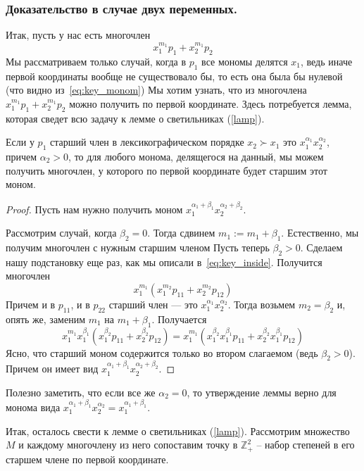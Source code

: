 \subsubsection{Доказательство в случае двух переменных.}
Итак, пусть у нас есть многочлен \[x_1^{m_1}p_1+x_2^{m_1}p_2\]
Мы рассматриваем только случай, когда в $p_1$ все мономы делятся $x_1$, ведь иначе первой координаты вообще не существовало бы, то есть она была бы нулевой (что видно из~\eqref{eq:key_monom})
Мы хотим узнать, что из многочлена $x_1^{m_1}p_1+x_2^{m_1}p_2$ можно получить по первой координате.
Здесь потребуется лемма, которая сведет всю задачу к лемме о светильниках (\ref{lamp}).\vskip 0.1in\noindent
\begin{lemma}
    Если у $p_1$ старший член в лексикографическом порядке $x_2\succ x_1$ это $x_1^{\alpha_1}x_2^{\alpha_2}$, причем $\alpha_2>0$, то для любого монома, делящегося на данный, мы можем получить многочлен, у которого по первой координате будет старшим этот моном.
\end{lemma}
\begin{proof}
    Пусть нам нужно получить моном $x_1^{\alpha_1+\beta_1}x_2^{\alpha_2+\beta_2}$.

    Рассмотрим случай, когда $\beta_2=0$.
    Тогда сдвинем %
    $m_1 := m_1+\beta_1$.
    Естественно, мы получим многочлен с нужным старшим членом
    Пусть теперь $\beta_2>0$.
    Сделаем нашу подстановку еще раз, как мы описали в~\eqref{eq:key_inside}.
    Получится многочлен
    \[x_1^{m_1}(x_1^{m_2} p_{11}+x_2^{m_2} p_{12})\]Причем и в $p_{11}$, и в $p_{22}$ старший член --- это $x_1^{\alpha_1}x_2^{\alpha_2}$.
    Тогда возьмем $m_2=\beta_2$ и, опять же, заменим $m_1$ на $m_1+ \beta_1$.
    Получается
    \[x_1^{m_1}x_1^{\beta_1}(x_1^{\beta_2} p_{11}+x_2^{\beta_2} p_{12})=x_1^{m_1}(x_1^{\beta_2}x_1^{\beta_1}p_{11}+x_2^{\beta_2}x_1^{\beta_1} p_{12})\]Ясно, что старший моном содержится только во втором слагаемом (ведь $\beta_2>0$). Причем он имеет вид $x_1^{\alpha_1+\beta_1}x_2^{\alpha_2+\beta_2}$.
\end{proof}
\begin{remark}
    \label{remark}
    Полезно заметить, что если все же $\alpha_2=0$, то утверждение леммы верно для монома вида $x_1^{\alpha_1+\beta_1}x_2^{\alpha_2}=x_1^{\alpha_1+\beta_1}$.
\end{remark}
\vskip 0.1in\noindent
Итак, осталось свести к лемме о светильниках (\ref{lamp}). Рассмотрим множество $M$ и каждому многочлену из него сопоставим точку в $\mathbb{Z}_+^2$ -- набор степеней в его старшем члене по первой координате.
